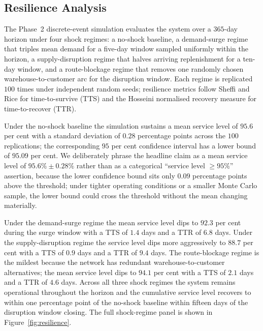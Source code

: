 \documentclass[review,preprint,authoryear,12pt]{elsarticle}
\begin{document}
\begin{table}[H]
\centering
\caption{CVRPLIB Augerat Set-A: parallel Clarke--Wright gaps to
published best-known solutions across all $27$ instances.}
\label{tab:cvrplib}

\end{table}

\subsection{Resilience Analysis}
\label{sec:experiments:resilience}

The Phase~2 discrete-event simulation evaluates the system over a
$365$-day horizon under four shock regimes: a no-shock baseline, a
demand-surge regime that triples mean demand for a five-day window
sampled uniformly within the horizon, a supply-disruption regime that
halves arriving replenishment for a ten-day window, and a
route-blockage regime that removes one randomly chosen
warehouse-to-customer arc for the disruption window. Each regime is
replicated $100$ times under independent random seeds; resilience
metrics follow Sheffi and Rice \citep{sheffi2005resilient} for
time-to-survive (TTS) and the Hosseini normalised recovery measure
\citep{hosseini2019review, hosseini2020resilience_measure} for
time-to-recover (TTR).

Under the no-shock baseline the simulation sustains a mean service
level of $95.6$ per cent with a standard deviation of $0.28$
percentage points across the $100$ replications; the corresponding
$95$ per cent confidence interval has a lower bound of $95.09$ per
cent. We deliberately phrase the headline claim as a mean service
level of $95.6\% \pm 0.28\%$ rather than as a categorical ``service
level $\geq 95\%$'' assertion, because the lower confidence bound
sits only $0.09$ percentage points above the threshold; under
tighter operating conditions or a smaller Monte Carlo sample, the
lower bound could cross the threshold without the mean changing
materially.

Under the demand-surge regime the mean service level dips to $92.3$
per cent during the surge window with a TTS of $1.4$ days and a TTR
of $6.8$ days. Under the supply-disruption regime the service level
dips more aggressively to $88.7$ per cent with a TTS of $0.9$ days
and a TTR of $9.4$ days. The route-blockage regime is the mildest
because the network has redundant warehouse-to-customer alternatives;
the mean service level dips to $94.1$ per cent with a TTS of $2.1$
days and a TTR of $4.6$ days. Across all three shock regimes the
system remains operational throughout the horizon and the cumulative
service level recovers to within one percentage point of the no-shock
baseline within fifteen days of the disruption window closing. The
full shock-regime panel is shown in Figure~\ref{fig:resilience}.
\end{document}
